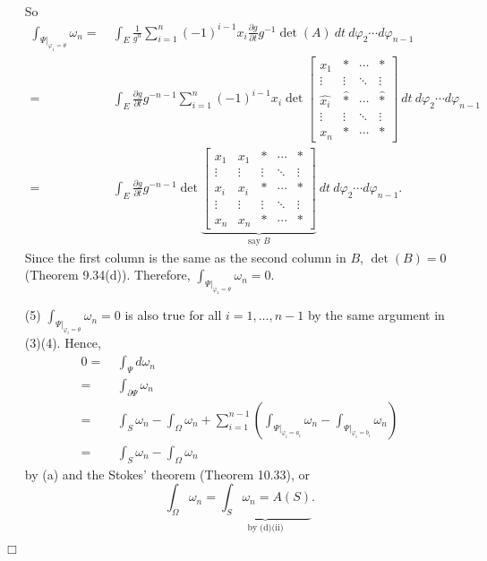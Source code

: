 \documentclass{article}
\begin{document}
\begin{enumerate}
\begin{align*}
  \end{align*}
  So
  \begin{align*}
    \int_{\Psi|_{\varphi_1=\theta}} \omega_n
    =& \: \int_{E} \frac{1}{g^n}
      \sum_{i=1}^{n} (-1)^{i-1} x_i
      \frac{\partial g}{\partial t} g^{-1}
      \det(A)
      \: dt \: d\varphi_2 \cdots d\varphi_{n-1} \\
    =& \: \int_{E} \frac{\partial g}{\partial t} g^{-n-1}
      \sum_{i=1}^{n} (-1)^{i-1} x_i
      \det
      \begin{bmatrix}
        x_1
          & *
          & \cdots
          & * \\
        \vdots & \vdots & \ddots & \vdots \\
        \widehat{x_i}
          & \widehat{*}
          & \cdots
          & \widehat{*} \\
        \vdots & \vdots & \ddots & \vdots \\
        x_n
          & *
          & \cdots
          & *
      \end{bmatrix}
      \: dt \: d\varphi_2 \cdots d\varphi_{n-1} \\
    =& \: \int_{E} \frac{\partial g}{\partial t} g^{-n-1}
      \det
      \underbrace{\begin{bmatrix}
        x_1
          & x_1
          & *
          & \cdots
          & * \\
        \vdots & \vdots & \vdots & \ddots & \vdots \\
        x_i
          & x_i
          & *
          & \cdots
          & * \\
        \vdots & \vdots & \vdots & \ddots & \vdots \\
        x_n
          & x_n
          & *
          & \cdots
          & *
      \end{bmatrix}}_{\text{say $B$}}
      \: dt \: d\varphi_2 \cdots d\varphi_{n-1}.
  \end{align*}
  Since the first column is the same as the second column in $B$,
  $\det(B) = 0$ (Theorem 9.34(d)).
  Therefore, $\int_{\Psi|_{\varphi_1=\theta}} \omega_n = 0$.

\item[(5)]
  $\int_{\Psi|_{\varphi_i=\theta}} \omega_n = 0$ is also true for all $i = 1,\ldots,n-1$
  by the same argument in (3)(4).
  Hence,
  \begin{align*}
    0
    =& \: \int_{\Psi} d\omega_n \\
    =& \: \int_{\partial \Psi} \omega_n \\
    =& \: \int_{S} \omega_n - \int_{\Omega} \omega_n
      + \sum_{i=1}^{n-1}
        \left( \int_{\Psi|_{\varphi_i=a_i}} \omega_n
        - \int_{\Psi|_{\varphi_i=b_i}} \omega_n \right) \\
    =& \: \int_{S} \omega_n - \int_{\Omega} \omega_n
  \end{align*}
  by (a) and the Stokes' theorem (Theorem 10.33),
  or
  \[
    \int_{\Omega} \omega_n = \underbrace{\int_{S} \omega_n = A(S)}_{\text{by (d)(ii)}}.
  \]
\end{enumerate}
$\Box$ \\
\end{document}
